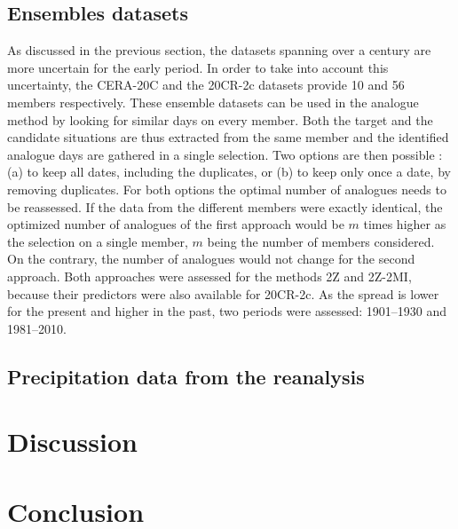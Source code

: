 \documentclass{ametsoc}
\begin{document}
\subsection{Ensembles datasets}

As discussed in the previous section, the datasets spanning over a century are more uncertain for the early period. In order to take into account this uncertainty, the CERA-20C and the 20CR-2c datasets provide 10 and 56 members respectively. These ensemble datasets can be used in the analogue method by looking for similar days on every member. Both the target and the candidate situations are thus extracted from the same member and the identified analogue days are gathered in a single selection. Two options are then possible : (a) to keep all dates, including the duplicates, or (b) to keep only once a date, by removing duplicates. For both options the optimal number of analogues needs to be reassessed. If the data from the different members were exactly identical, the optimized number of analogues of the first approach would be $m$ times higher as the selection on a single member, $m$ being the number of members considered. On the contrary, the number of analogues would not change for the second approach. Both approaches were assessed for the methods 2Z and 2Z-2MI, because their predictors were also available for 20CR-2c. As the spread is lower for the present and higher in the past, two periods were assessed: 1901--1930 and 1981--2010.







\subsection{Precipitation data from the reanalysis}


\section{Discussion}


\section{Conclusion}
\end{document}

